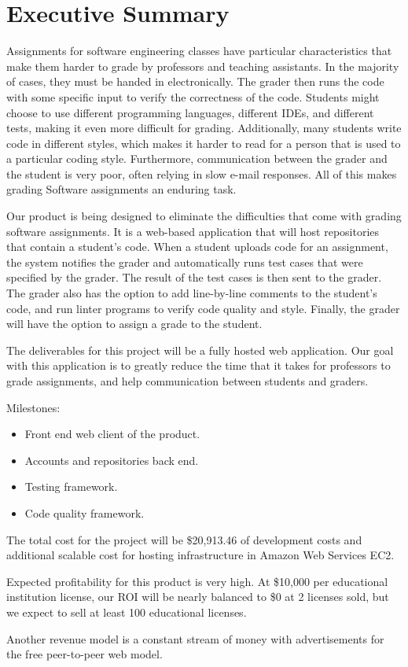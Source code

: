 \part*{Executive Summary} Assignments for software engineering classes have particular
characteristics that make them harder to grade by professors and teaching
assistants. In the majority of cases, they must be handed in electronically. The
grader then runs the code with some specific input to verify the correctness of
the code. Students might choose to use different programming languages,
different IDEs, and different tests, making it even more difficult for grading.
Additionally, many students write code in different styles, which makes it
harder to read for a person that is used to a particular coding style.
Furthermore, communication between the grader and the student is very poor,
often relying in slow e-mail responses.  All of this makes grading Software
assignments an enduring task.

Our product is being designed to eliminate the difficulties that come with
grading software assignments. It is a web-based application that will
host repositories that contain a student's code. When a student uploads code
for an assignment, the system notifies the grader and automatically runs test
cases that were specified by the grader. The result of the test cases is then
sent to the grader. The grader also has the option to add line-by-line comments
to the student's code, and run linter programs to verify code quality and
style. Finally, the grader will have the option to assign a grade to the
student.

The deliverables for this project will be a fully hosted web application. Our
goal with this application is to greatly reduce the time that it takes for
professors to grade assignments, and help communication between students and
graders.

Milestones:
\begin{itemize}
\item Front end web client of the product.
\item Accounts and repositories back end.
\item Testing framework.
\item Code quality framework.
\end{itemize}

The total cost for the project will be \$20,913.46 of development costs and
additional scalable cost for hosting infrastructure in Amazon Web Services EC2.

Expected profitability for this product is
very high. At \$10,000 per educational institution license, our ROI will be
nearly balanced to \$0 at 2 licenses sold, but we expect to sell at least 100
educational licenses.

Another revenue model is a constant stream of money with advertisements for the
free peer-to-peer web model.
